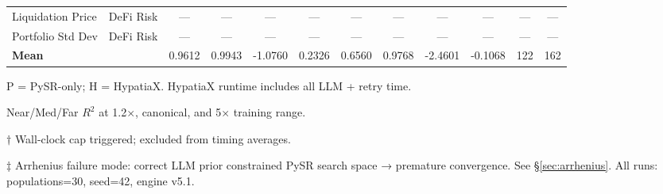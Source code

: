 \begin{table}[htbp]
{\begin{tabular}{llcccccccccc}
Liquidation Price & DeFi Risk & --- & --- & --- & --- & --- & --- & --- & --- & --- & --- \\
Portfolio Std Dev & DeFi Risk & --- & --- & --- & --- & --- & --- & --- & --- & --- & --- \\
\midrule
\textbf{Mean} & & 0.9612 & 0.9943 & -1.0760 & 0.2326 & 0.6560 & 0.9768 & -2.4601 & -0.1068 & 122 & 162 \\
\bottomrule
\end{tabular}%
}
\begin{tablenotes}\small
\item P = PySR-only; H = HypatiaX. HypatiaX runtime includes all LLM + retry time.
\item Near/Med/Far $R^2$ at 1.2$\times$, canonical, and 5$\times$ training range.
\item[$\dag$] Wall-clock cap triggered; excluded from timing averages.
\item[$\ddag$] Arrhenius failure mode: correct LLM prior constrained PySR search space → premature convergence. See \S\ref{sec:arrhenius}. All runs: populations=30, seed=42, engine v5.1.
\end{tablenotes}
\end{table}